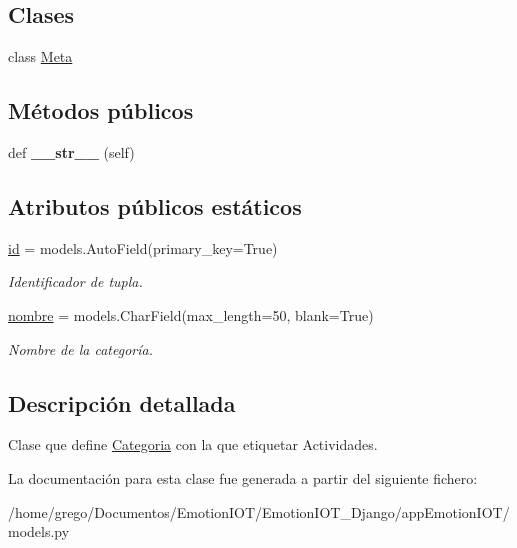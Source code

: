 \subsection*{Clases}
\begin{DoxyCompactItemize}
\item 
class \hyperlink{classappEmotionIOT_1_1models_1_1Categoria_1_1Meta}{Meta}
\end{DoxyCompactItemize}
\subsection*{Métodos públicos}
\begin{DoxyCompactItemize}
\item 
def {\bfseries \+\_\+\+\_\+str\+\_\+\+\_\+} (self)\hypertarget{classappEmotionIOT_1_1models_1_1Categoria_a75cf468f95a0aa7872973ebaf95bca8f}{}\label{classappEmotionIOT_1_1models_1_1Categoria_a75cf468f95a0aa7872973ebaf95bca8f}

\end{DoxyCompactItemize}
\subsection*{Atributos públicos estáticos}
\begin{DoxyCompactItemize}
\item 
\hyperlink{classappEmotionIOT_1_1models_1_1Categoria_a61e5da0af916030979cf324c7ed0e859}{id} = models.\+Auto\+Field(primary\+\_\+key=True)\hypertarget{classappEmotionIOT_1_1models_1_1Categoria_a61e5da0af916030979cf324c7ed0e859}{}\label{classappEmotionIOT_1_1models_1_1Categoria_a61e5da0af916030979cf324c7ed0e859}

\begin{DoxyCompactList}\small\item\em Identificador de tupla. \end{DoxyCompactList}\item 
\hyperlink{classappEmotionIOT_1_1models_1_1Categoria_a6885c5989aada8225e50234c26432726}{nombre} = models.\+Char\+Field(max\+\_\+length=50, blank=True)\hypertarget{classappEmotionIOT_1_1models_1_1Categoria_a6885c5989aada8225e50234c26432726}{}\label{classappEmotionIOT_1_1models_1_1Categoria_a6885c5989aada8225e50234c26432726}

\begin{DoxyCompactList}\small\item\em Nombre de la categoría. \end{DoxyCompactList}\end{DoxyCompactItemize}


\subsection{Descripción detallada}
Clase que define \hyperlink{classappEmotionIOT_1_1models_1_1Categoria}{Categoria} con la que etiquetar Actividades. 

La documentación para esta clase fue generada a partir del siguiente fichero\+:\begin{DoxyCompactItemize}
\item 
/home/grego/\+Documentos/\+Emotion\+I\+O\+T/\+Emotion\+I\+O\+T\+\_\+\+Django/app\+Emotion\+I\+O\+T/models.\+py\end{DoxyCompactItemize}

